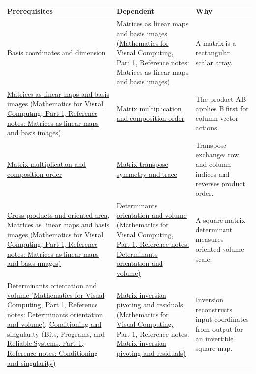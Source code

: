 {\def\LTcaptype{none} %
\begin{longtable}[]{@{}
  >{\raggedright\arraybackslash}p{}
  >{\raggedright\arraybackslash}p{}
  >{\raggedright\arraybackslash}p{}@{}}
\toprule\noalign{}
\begin{minipage}[b]{\linewidth}\raggedright
Prerequisites
\end{minipage} & \begin{minipage}[b]{\linewidth}\raggedright
Dependent
\end{minipage} & \begin{minipage}[b]{\linewidth}\raggedright
Why
\end{minipage} \\
\midrule\noalign{}
\endhead
\bottomrule\noalign{}
\endlastfoot
\hyperref[appendix-ce0341f7ea0d]{Basis coordinates and dimension} & \href{../02-Mathematics-for-Visual-Computing-P01/main.pdf\#appendix-bd39c3bf5d64}{Matrices as linear maps and basis images (Mathematics for Visual Computing, Part 1, Reference notes: Matrices as linear maps and basis images)} & A matrix is a rectangular scalar array. \\
\href{../02-Mathematics-for-Visual-Computing-P01/main.pdf\#appendix-bd39c3bf5d64}{Matrices as linear maps and basis images (Mathematics for Visual Computing, Part 1, Reference notes: Matrices as linear maps and basis images)} & \hyperref[appendix-ab31ef447dbf]{Matrix multiplication and composition order} & The product AB applies B first for column-vector actions. \\
\hyperref[appendix-ab31ef447dbf]{Matrix multiplication and composition order} & \hyperref[appendix-175ca5ff874d]{Matrix transpose symmetry and trace} & Transpose exchanges row and column indices and reverses product order. \\
\hyperref[appendix-2391db8052b1]{Cross products and oriented area}, \href{../02-Mathematics-for-Visual-Computing-P01/main.pdf\#appendix-bd39c3bf5d64}{Matrices as linear maps and basis images (Mathematics for Visual Computing, Part 1, Reference notes: Matrices as linear maps and basis images)} & \href{../02-Mathematics-for-Visual-Computing-P01/main.pdf\#appendix-da478be01d02}{Determinants orientation and volume (Mathematics for Visual Computing, Part 1, Reference notes: Determinants orientation and volume)} & A square matrix determinant measures oriented volume scale. \\
\href{../02-Mathematics-for-Visual-Computing-P01/main.pdf\#appendix-da478be01d02}{Determinants orientation and volume (Mathematics for Visual Computing, Part 1, Reference notes: Determinants orientation and volume)}, \href{../01-Bits-Programs-and-Reliable-Systems-P01/main.pdf\#appendix-8f6a01f284a7}{Conditioning and singularity (Bits, Programs, and Reliable Systems, Part 1, Reference notes: Conditioning and singularity)} & \href{../02-Mathematics-for-Visual-Computing-P01/main.pdf\#appendix-48d2e66378ab}{Matrix inversion pivoting and residuals (Mathematics for Visual Computing, Part 1, Reference notes: Matrix inversion pivoting and residuals)} & Inversion reconstructs input coordinates from output for an invertible square map. \\

\end{longtable}}

